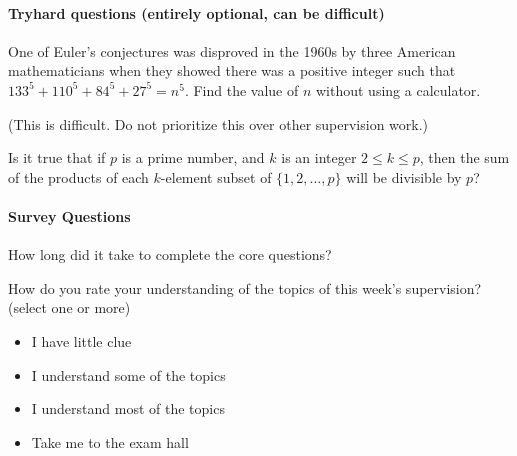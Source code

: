 \documentclass{exam}
\begin{document}
\paragraph{Tryhard questions (entirely optional, can be difficult)}
\begin{questions}

\question One of Euler's conjectures was disproved in the 1960s by three American mathematicians when they showed there was a positive integer such that $133^5+110^5+84^5+27^5=n^5$. Find the value of ${n}$ without using a calculator.

\question (This is difficult. Do not prioritize this over other supervision work.)

Is it true that if $p$ is a prime number, and $k$ is an integer $2 \le k \le p$, then the sum of the products of each $k$-element subset of $\{1, 2, \ldots, p\}$ will be divisible by $p$? 


\end{questions}

\paragraph{Survey Questions}
\begin{questions}
\question How long did it take to complete the core questions?
 
\question How do you rate your understanding of the topics of this week's supervision? (select one or more)

\begin{itemize}
\item
I have little clue
\item 
I understand some of the topics
\item
I understand most of the topics
\item
Take me to the exam hall
\end{itemize}
\end{questions}
\end{document}
